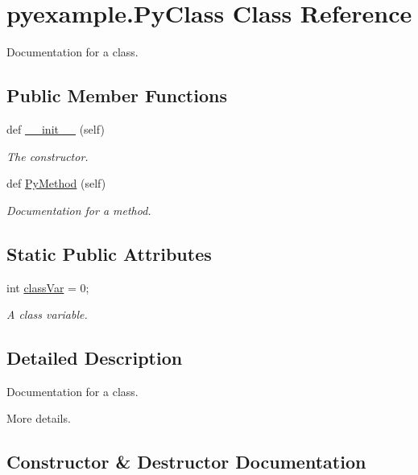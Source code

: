 \hypertarget{classpyexample_1_1PyClass}{}\section{pyexample.\+Py\+Class Class Reference}
\label{classpyexample_1_1PyClass}


Documentation for a class.  


\subsection*{Public Member Functions}
\begin{DoxyCompactItemize}
\item 
def \hyperlink{classpyexample_1_1PyClass_a87e20fe7e81cb5a1c04e620c076ab8ac}{\+\_\+\+\_\+init\+\_\+\+\_\+} (self)
\begin{DoxyCompactList}\small\item\em The constructor. \end{DoxyCompactList}\item 
def \hyperlink{classpyexample_1_1PyClass_a654596774eb28a0c6d26eea565de3a9d}{Py\+Method} (self)
\begin{DoxyCompactList}\small\item\em Documentation for a method. \end{DoxyCompactList}\end{DoxyCompactItemize}
\subsection*{Static Public Attributes}
\begin{DoxyCompactItemize}
\item 
int \hyperlink{classpyexample_1_1PyClass_abd17aff54e5b0ca194020c796c733546}{class\+Var} = 0;
\begin{DoxyCompactList}\small\item\em A class variable. \end{DoxyCompactList}\end{DoxyCompactItemize}


\subsection{Detailed Description}
Documentation for a class. 

More details. 

\subsection{Constructor \& Destructor Documentation}
\mbox{\label{classpyexample_1_1PyClass_a87e20fe7e81cb5a1c04e620c076ab8ac}} 
